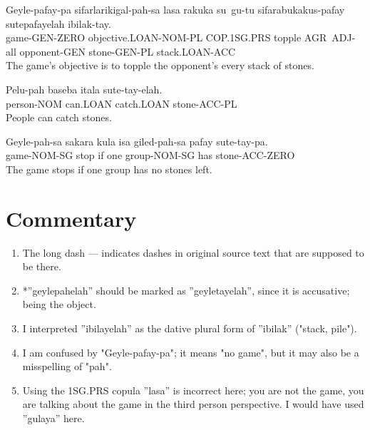 \documentclass{thiguka}
\begin{document}
\begin{exe}
\ex{} \gll{}Geyle-pafay-pa sifarlarikigal-pah-sa lasa rakuka su~gu-tu sifarabukakus-pafay sutepafayelah ibilak-tay.\\
            game-GEN-ZERO objective.LOAN-NOM-PL COP.1SG.PRS topple AGR~ADJ-all opponent-GEN stone-GEN-PL stack.LOAN-ACC\\
      \glt{}The game's objective is to topple the opponent's every stack of stones.
\end{exe}

\begin{exe}
\ex{} \gll{}Pelu-pah baseba itala sute-tay-elah.\\
            person-NOM can.LOAN catch.LOAN stone-ACC-PL\\
      \glt{}People can catch stones.
\end{exe}

\begin{exe}
\ex{} \gll{}Geyle-pah-sa sakara kula isa giled-pah-sa pafay sute-tay-pa.\\
            game-NOM-SG stop if one group-NOM-SG has stone-ACC-ZERO\\
      \glt{}The game stops if one group has no stones left.
\end{exe}

\section{Commentary}
\begin{enumerate}
    \item The long dash --- indicates dashes in original source text that are supposed to be there.
    \item *''geylepahelah'' should be marked as ''geyletayelah'', since it is accusative; being the object.
    \item I interpreted ''ibilayelah'' as the dative plural form of ''ibilak'' ("stack, pile").
    \item I am confused by "Geyle-pafay-pa"; it means "no game", but it may also be a misspelling of "pah".
    \item Using the 1SG.PRS copula ''lasa'' is incorrect here; you are not the game, you are talking about the game in the third person perspective. I would have used ''gulaya'' here.
\end{enumerate}

\newpage
\end{document}
